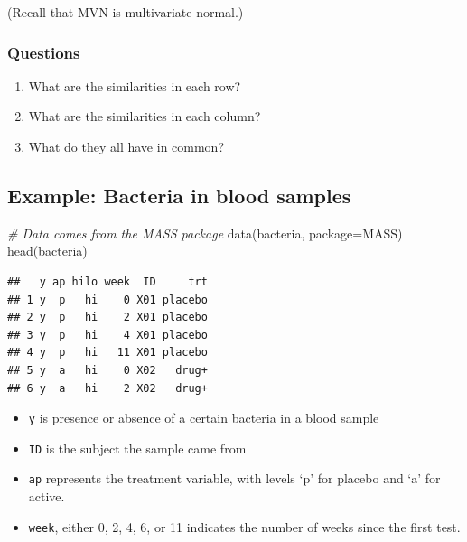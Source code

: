 \documentclass[
  openany]{book}
\newenvironment{Shaded}{\begin{snugshade}}{\end{snugshade}}
\newcommand{\AttributeTok}[1]{\textcolor[rgb]{0.77,0.63,0.00}{#1}}
\newcommand{\CommentTok}[1]{\textcolor[rgb]{0.56,0.35,0.01}{\textit{#1}}}
\newcommand{\FunctionTok}[1]{\textcolor[rgb]{0.00,0.00,0.00}{#1}}
\newcommand{\NormalTok}[1]{#1}
\newcommand{\StringTok}[1]{\textcolor[rgb]{0.31,0.60,0.02}{#1}}
\providecommand{\tightlist}{%
  \setlength{\itemsep}{0pt}\setlength{\parskip}{0pt}}
\begin{document}
(Recall that MVN is multivariate normal.)

\hypertarget{questions}{%
\subsubsection{Questions}\label{questions}}

\begin{enumerate}
\def\labelenumi{\arabic{enumi}.}
\item
  What are the similarities in each row?
\item
  What are the similarities in each column?
\item
  What do they all have in common?
\end{enumerate}

\hypertarget{example-bacteria-in-blood-samples}{%
\subsection{Example: Bacteria in blood samples 🦠💉}\label{example-bacteria-in-blood-samples}}

\begin{Shaded}
\begin{Highlighting}[]
\CommentTok{\# Data comes from the MASS package}
\FunctionTok{data}\NormalTok{(bacteria, }\AttributeTok{package=}\StringTok{\textquotesingle{}MASS\textquotesingle{}}\NormalTok{)}
\FunctionTok{head}\NormalTok{(bacteria)}
\end{Highlighting}
\end{Shaded}

\begin{verbatim}
##   y ap hilo week  ID     trt
## 1 y  p   hi    0 X01 placebo
## 2 y  p   hi    2 X01 placebo
## 3 y  p   hi    4 X01 placebo
## 4 y  p   hi   11 X01 placebo
## 5 y  a   hi    0 X02   drug+
## 6 y  a   hi    2 X02   drug+
\end{verbatim}

\begin{itemize}
\tightlist
\item
  \texttt{y} is presence or absence of a certain bacteria in a blood sample
\item
  \texttt{ID} is the subject the sample came from
\item
  \texttt{ap} represents the treatment variable, with levels `p' for placebo and `a' for active.
\item
  \texttt{week}, either 0, 2, 4, 6, or 11 indicates the number of weeks since the first test.
\end{itemize}
\end{document}
